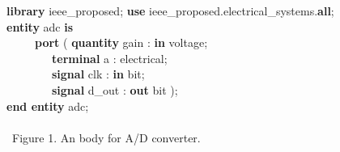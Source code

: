 {\small
\begin{tabbing}
\ \ \ \= \textbf{library} ieee\_proposed; \textbf{use} ieee\_proposed.electrical\_systems.\textbf{all}; \\ 
\ \ \ \= \textbf{entity} adc \textbf{is} \\
\> \ \ \ \ \ \ \ \ \= \textbf{port} ( \textbf{quantity} gain : \textbf{in} voltage; \\
\> \> \ \ \ \ \ \ \ \ \ \ \ \= \textbf{terminal} a : electrical; \\
\> \> \ \ \ \ \ \ \ \ \ \ \ \= \textbf{signal} clk : \textbf{in} bit; \\
\> \> \ \ \ \ \ \ \ \ \ \ \ \= \textbf{signal} d\_out : \textbf{out} bit ); \\
\ \ \ \= \textbf{end entity} adc;
\ \ \ \     \\
\ \ \ \     \\
\ \ \ \ Figure 1. An \ent body for A/D converter.
\end{tabbing}
}

